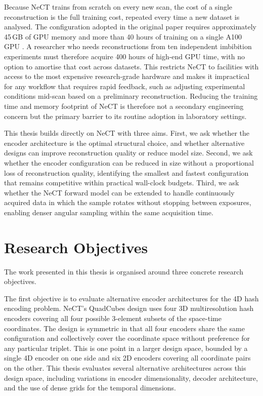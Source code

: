 \documentclass[12pt, a4paper, twoside]{report}
\begin{document}
Because NeCT trains from scratch on every new scan, the cost of a single reconstruction is the full training cost, repeated every time a new dataset is analysed. The configuration adopted in the original paper requires approximately 45\,GB of GPU memory and more than 40 hours of training on a single A100 GPU \citep{friis2025nect}. A researcher who needs reconstructions from ten independent imbibition experiments must therefore acquire 400 hours of high-end GPU time, with no option to amortise that cost across datasets. This restricts NeCT to facilities with access to the most expensive research-grade hardware and makes it impractical for any workflow that requires rapid feedback, such as adjusting experimental conditions mid-scan based on a preliminary reconstruction. Reducing the training time and memory footprint of NeCT is therefore not a secondary engineering concern but the primary barrier to its routine adoption in laboratory settings.

This thesis builds directly on NeCT with three aims. First, we ask whether the encoder architecture is the optimal structural choice, and whether alternative designs can improve reconstruction quality or reduce model size. Second, we ask whether the encoder configuration can be reduced in size without a proportional loss of reconstruction quality, identifying the smallest and fastest configuration that remains competitive within practical wall-clock budgets. Third, we ask whether the NeCT forward model can be extended to handle continuously acquired data in which the sample rotates without stopping between exposures, enabling denser angular sampling within the same acquisition time.

\section{Research Objectives}
\label{sec:intro_objectives}

The work presented in this thesis is organised around three concrete research objectives.

The first objective is to evaluate alternative encoder architectures for the 4D hash encoding problem. NeCT's QuadCubes design uses four 3D multiresolution hash encoders covering all four possible 3-element subsets of the space-time coordinates. The design is symmetric in that all four encoders share the same configuration and collectively cover the coordinate space without preference for any particular triplet. This is one point in a larger design space, bounded by a single 4D encoder on one side and six 2D encoders covering all coordinate pairs on the other. This thesis evaluates several alternative architectures across this design space, including variations in encoder dimensionality, decoder architecture, and the use of dense grids for the temporal dimensions.
\end{document}

